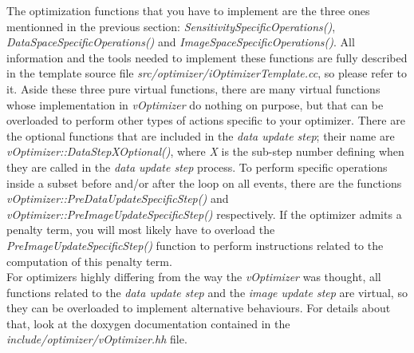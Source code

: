 \documentclass[a4paper, 11pt]{article}
\begin{document}
The optimization functions that you have to implement are the three ones mentionned in the previous section: \textit{SensitivitySpecificOperations()}, \textit{DataSpaceSpecificOperations()} and \textit{ImageSpaceSpecificOperations()}.
All information and the tools needed to implement these functions are fully described in the template source file \textit{src/optimizer/iOptimizerTemplate.cc}, so please refer to it.
Aside these three pure virtual functions, there are many virtual functions whose implementation in \textit{vOptimizer} do nothing on purpose, but that can be overloaded to perform other types of actions specific to your optimizer.
There are the optional functions that are included in the \textit{data update step}; their name are \textit{vOptimizer::DataStepXOptional()}, where \textit{X} is the sub-step number defining when they are called in the \textit{data update step} process.
To perform specific operations inside a subset before and/or after the loop on all events, there are the functions \textit{vOptimizer::PreDataUpdateSpecificStep()} and \textit{vOptimizer::PreImageUpdateSpecificStep()} respectively.
If the optimizer admits a penalty term, you will most likely have to overload the \textit{PreImageUpdateSpecificStep()} function to perform instructions related to the computation of this penalty term.\\

For optimizers highly differing from the way the \textit{vOptimizer} was thought, all functions related to the \textit{data update step} and the \textit{image update step} are virtual, so they can be overloaded to implement alternative behaviours.
For details about that, look at the doxygen documentation contained in the \textit{include/optimizer/vOptimizer.hh} file.\\
\end{document}
